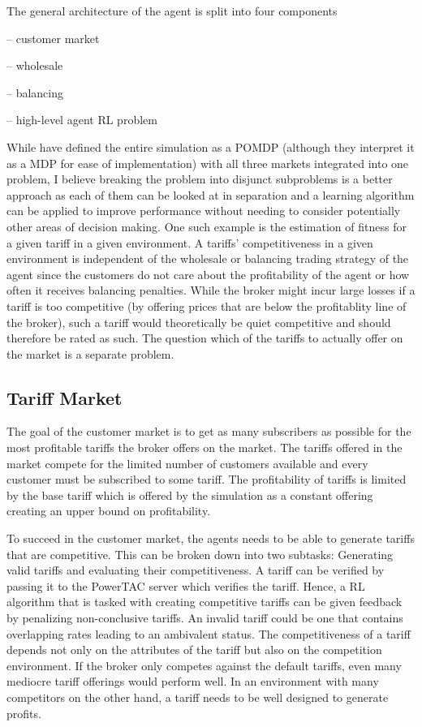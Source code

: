 The general architecture of the agent is split into four components

-- customer market

-- wholesale 

-- balancing 

-- high-level agent \ac {RL} problem

While \citep{tactexurieli2016mdp} have defined the entire simulation as a \ac {POMDP} (although they interpret it as a \ac {MDP} for ease of implementation) with all three markets
integrated into one problem, I believe breaking the problem into disjunct subproblems is a better approach as each of
them can be looked at in separation and a learning algorithm can be applied to improve performance without needing to
consider potentially other areas of decision making. One such example is the estimation of fitness for a given tariff in
a given environment. A tariffs' competitiveness in a given environment is independent of the wholesale or balancing
trading strategy of the agent since the customers do not care about the profitability of the agent or how often it
receives balancing penalties. While the broker might incur large losses if a tariff is too competitive (by offering prices that are below the profitablity line of the broker), such a tariff would theoretically be quiet competitive and should therefore be rated as such. The question which of the tariffs to actually offer on the market is a separate problem.

\subsection{Tariff Market}

The goal of the customer market is to get as many subscribers as possible for the most profitable tariffs the broker
offers on the market. The tariffs offered in the market compete for the limited number of customers available and every
customer must be subscribed to some tariff. The profitability of tariffs is limited by the base tariff which is offered
by the simulation as a constant offering creating an upper bound on profitability. 

To succeed in the customer market, the agents needs to be able to generate tariffs that are competitive. This can be
broken down into two subtasks: Generating valid tariffs and evaluating their competitiveness. A tariff can be
verified by passing it to the \ac {PowerTAC} server which verifies the tariff. Hence, a \ac {RL} algorithm that is
tasked with creating competitive tariffs can be given feedback by penalizing non-conclusive tariffs. An invalid tariff
could be one that contains overlapping rates leading to an ambivalent status. The competitiveness of a tariff depends
not only on the attributes of the tariff but also on the competition environment. If the broker only competes against
the default tariffs, even many mediocre tariff offerings would perform well. In an environment with many competitors on
the other hand, a tariff needs to be well designed to generate profits. 

